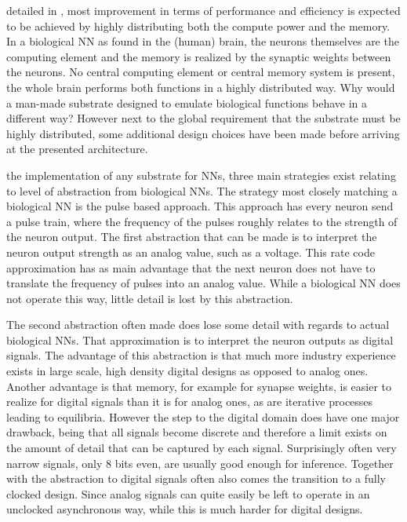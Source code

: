  detailed in , most improvement in terms of performance and efficiency is expected to be achieved by highly distributing both the compute power and the memory. In a biological \ac{NN} as found in the (human) brain, the neurons themselves are the computing element and the memory is realized by the synaptic weights between the neurons. No central computing element or central memory system is present, the whole brain performs both functions in a highly distributed way. Why would a man-made substrate designed to emulate biological functions behave in a different way? However next to the global requirement that the substrate must be highly distributed, some additional design choices have been made before arriving at the presented architecture.

 the implementation of any substrate for \acp{NN}, three main strategies exist relating to level of abstraction from biological \acp{NN}. The strategy most closely matching a biological \ac{NN} is the pulse based approach. This approach has every neuron send a pulse train, where the frequency of the pulses roughly relates to the strength of the neuron output. The first abstraction that can be made is to interpret the neuron output strength as an analog value, such as a voltage. This rate code approximation has as main advantage that the next neuron does not have to translate the frequency of pulses into an analog value. While a biological \ac{NN} does not operate this way, little detail is lost by this abstraction.

The second abstraction often made does lose some detail with regards to actual biological \acp{NN}. That approximation is to interpret the neuron outputs as digital signals. The advantage of this abstraction is that much more industry experience exists in large scale, high density digital designs as opposed to analog ones. Another advantage is that memory, for example for synapse weights, is easier to realize for digital signals than it is for analog ones, as are iterative processes leading to equilibria. However the step to the digital domain does have one major drawback, being that all signals become discrete and therefore a limit exists on the amount of detail that can be captured by each signal. Surprisingly often very narrow signals, only 8 bits even, are usually good enough for inference\cite{8192463}. Together with the abstraction to digital signals often also comes the transition to a fully clocked design. Since analog signals can quite easily be left to operate in an unclocked asynchronous way, while this is much harder for digital designs.

